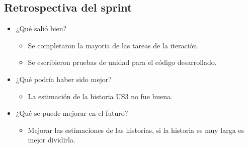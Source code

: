 \subsection{Retrospectiva del sprint}
\begin{itemize}
  \item ¿Qué salió bien?
    \begin{itemize}
        \item Se completaron la mayoria de las tareas de la iteración.
        \item Se escribieron pruebas de unidad para el código desarrollado.
    \end{itemize}

  \item ¿Qué podría haber sido mejor?
    \begin{itemize}
        \item La estimación de la historia US3 no fue buena.
    \end{itemize}

  \item ¿Qué  se puede mejorar en el futuro?
    \begin{itemize}
        \item Mejorar las estimaciones de las historias, si la historia es muy larga es mejor dividirla.
    \end{itemize}
\end{itemize}

